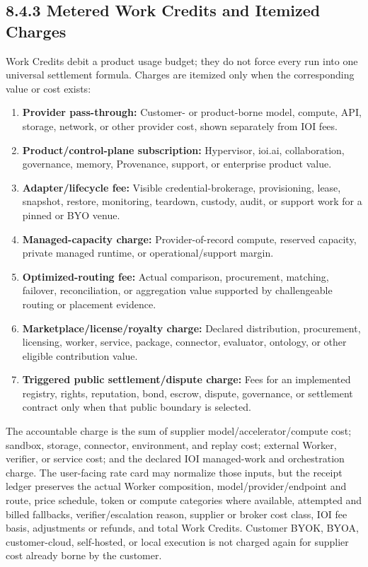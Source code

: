 \documentclass[
  11pt,
]{article}
\providecommand{\tightlist}{%
  \setlength{\itemsep}{0pt}\setlength{\parskip}{0pt}}
\begin{document}
\hypertarget{metered-work-credit-model-the-micro-split-settlement}{%
\subsection{8.4.3 Metered Work Credits and Itemized
Charges}\label{metered-work-credit-model-the-micro-split-settlement}}

Work Credits debit a product usage budget; they do not force every run into
one universal settlement formula. Charges are itemized only when the
corresponding value or cost exists:

\begin{enumerate}
\def\labelenumi{\arabic{enumi}.}
\tightlist
\item
  \textbf{Provider pass-through:} Customer- or product-borne model,
  compute, API, storage, network, or other provider cost, shown separately
  from IOI fees.
\item
  \textbf{Product/control-plane subscription:} Hypervisor, ioi.ai,
  collaboration, governance, memory, Provenance, support, or enterprise
  product value.
\item
  \textbf{Adapter/lifecycle fee:} Visible credential-brokerage,
  provisioning, lease, snapshot, restore, monitoring, teardown, custody,
  audit, or support work for a pinned or BYO venue.
\item
  \textbf{Managed-capacity charge:} Provider-of-record compute, reserved
  capacity, private managed runtime, or operational/support margin.
\item
  \textbf{Optimized-routing fee:} Actual comparison, procurement,
  matching, failover, reconciliation, or aggregation value supported by
  challengeable routing or placement evidence.
\item
  \textbf{Marketplace/license/royalty charge:} Declared distribution,
  procurement, licensing, worker, service, package, connector, evaluator,
  ontology, or other eligible contribution value.
\item
  \textbf{Triggered public settlement/dispute charge:} Fees for an
  implemented registry, rights, reputation, bond, escrow, dispute,
  governance, or settlement contract only when that public boundary is
  selected.
\end{enumerate}

The accountable charge is the sum of supplier model/accelerator/compute
cost; sandbox, storage, connector, environment, and replay cost; external
Worker, verifier, or service cost; and the declared IOI managed-work and
orchestration charge. The user-facing rate card may normalize those
inputs, but the receipt ledger preserves the actual Worker composition,
model/provider/endpoint and route, price schedule, token or compute
categories where available, attempted and billed fallbacks,
verifier/escalation reason, supplier or broker cost class, IOI fee basis,
adjustments or refunds, and total Work Credits. Customer BYOK, BYOA,
customer-cloud, self-hosted, or local execution is not charged again for
supplier cost already borne by the customer.
\end{document}
